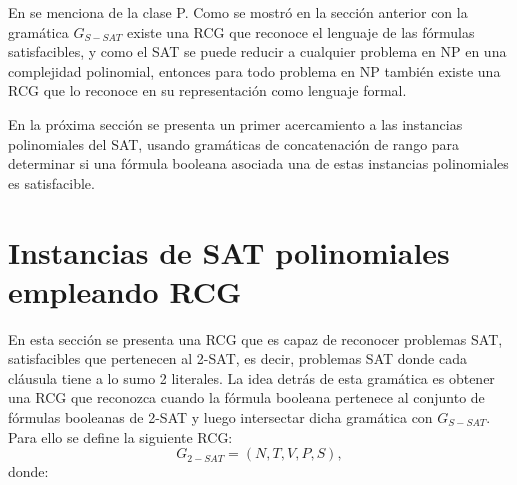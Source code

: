 \documentclass[12pt]{article}
\begin{document}
En \cite{propertiesRCGBib2} se menciona  de la clase P. Como se mostró en la sección anterior con la gramática $G_{S-SAT}$ existe una RCG que reconoce el lenguaje de las fórmulas satisfacibles, y como el SAT se puede reducir a cualquier problema en NP en una complejidad polinomial, entonces para todo problema en NP también existe una RCG que lo reconoce en su representación como lenguaje formal.

En la próxima sección se presenta un primer acercamiento a las instancias polinomiales del SAT, usando gramáticas de concatenación de rango
para determinar si una fórmula booleana asociada una de estas instancias polinomiales es satisfacible.

\section{Instancias de SAT polinomiales empleando RCG}

En esta sección se presenta una RCG que es capaz de reconocer problemas SAT, satisfacibles que pertenecen al 2-SAT, es decir, problemas SAT donde cada cláusula tiene a lo sumo 2 literales. La idea detrás de esta gramática es obtener una RCG que reconozca cuando la fórmula booleana pertenece al conjunto de fórmulas booleanas de 2-SAT y luego intersectar dicha gramática con $G_{S-SAT}$.  Para ello se define la siguiente RCG:
\[
    G_{2-SAT} = (N, T, V, P, S),
\]
donde:
\end{document}
